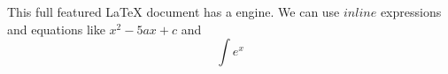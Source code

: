 \markdownRendererUlBegin
\markdownRendererUlItem This full featured LaTeX document has a  engine.\markdownRendererUlItemEnd 
\markdownRendererUlItem We can use $inline$ expressions and equations like $x^2-5ax+c$ and $$\int e^x$$\markdownRendererUlItemEnd 
\markdownRendererUlEnd \relax
